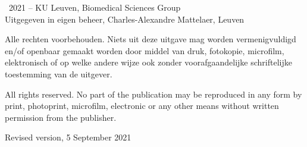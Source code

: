 
\null\vfill

\noindent
\textcopyright\ 2021 -- KU Leuven, Biomedical Sciences Group\\
Uitgegeven in eigen beheer, Charles-Alexandre Mattelaer, Leuven

\null

\noindent
Alle rechten voorbehouden. Niets uit deze uitgave mag worden vermenigvuldigd en/of openbaar gemaakt worden door middel van druk, fotokopie, microfilm, elektronisch of op welke andere wijze ook zonder voorafgaandelijke schriftelijke toestemming van de uitgever.

\null

\noindent
All rights reserved. No part of the publication may be reproduced in any form by print, photoprint, microfilm, electronic or any other means without written permission from the publisher.

\null

\noindent
Revised version, 5 September 2021